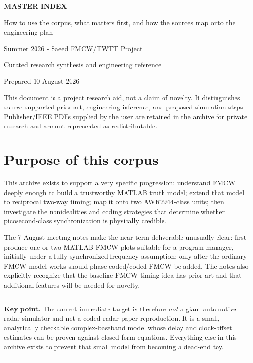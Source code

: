 \documentclass[11pt]{article}
\newenvironment{keybox}{\begin{center}\begin{minipage}{0.94\textwidth}\hrule\vspace{0.45em}\textbf{Key point.} }{\vspace{0.45em}\hrule\end{minipage}\end{center}}
\begin{document}
\begin{titlepage}
\centering
\vspace*{1.2in}
{\Huge\bfseries\color{navy} MASTER INDEX\par}
\vspace{0.3in}
{\Large How to use the corpus, what matters first, and how the sources map onto the engineering plan\par}
\vspace{0.6in}
{\large Summer 2026 - Saeed FMCW/TWTT Project\par}
\vfill
{\large Curated research synthesis and engineering reference\par}
{\large Prepared 10 August 2026\par}
\vspace{0.4in}
\begin{minipage}{0.82\textwidth}
\small
This document is a project research aid, not a claim of novelty. It distinguishes source-supported prior art, engineering inference, and proposed simulation steps. Publisher/IEEE PDFs supplied by the user are retained in the archive for private research and are not represented as redistributable.
\end{minipage}
\end{titlepage}
\tableofcontents
\clearpage

\section{Purpose of this corpus}
This archive exists to support a very specific progression: understand FMCW deeply enough to build a trustworthy MATLAB truth model; extend that model to reciprocal two-way timing; map it onto two AWR2944-class units; then investigate the nonidealities and coding strategies that determine whether picosecond-class synchronization is physically credible.

The 7 August meeting notes make the near-term deliverable unusually clear: first produce one or two MATLAB FMCW plots suitable for a program manager, initially under a fully synchronized-frequency assumption; only after the ordinary FMCW model works should phase-coded/coded FMCW be added. The notes also explicitly recognize that the baseline FMCW timing idea has prior art and that additional features will be needed for novelty.

\begin{keybox}
The correct immediate target is therefore \emph{not} a giant automotive radar simulator and not a coded-radar paper reproduction. It is a small, analytically checkable complex-baseband model whose delay and clock-offset estimates can be proven against closed-form equations. Everything else in this archive exists to prevent that small model from becoming a dead-end toy.
\end{keybox}
\end{document}
